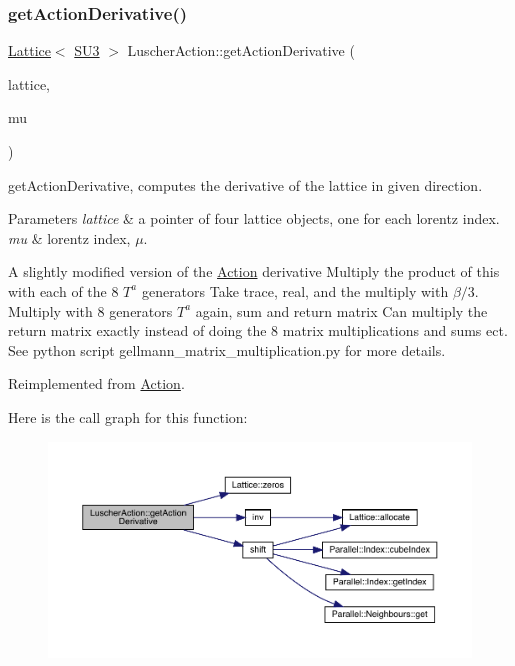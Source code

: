 \subsubsection{\texorpdfstring{getActionDerivative()}{getActionDerivative()}}
{\footnotesize\ttfamily \mbox{\hyperlink{class_lattice}{Lattice}}$<$ \mbox{\hyperlink{class_s_u3}{S\+U3}} $>$ Luscher\+Action\+::get\+Action\+Derivative (\begin{DoxyParamCaption}\item[{\mbox{\hyperlink{class_lattice}{Lattice}}$<$ \mbox{\hyperlink{class_s_u3}{S\+U3}} $>$ $\ast$}]{lattice,  }\item[{int}]{mu }\end{DoxyParamCaption})\hspace{0.3cm}{\ttfamily [virtual]}}



get\+Action\+Derivative, computes the derivative of the lattice in given direction. 


\begin{DoxyParams}{Parameters}
{\em lattice} & a pointer of four lattice objects, one for each lorentz index. \\
\hline
{\em mu} & lorentz index, $\mu$. \\
\hline
\end{DoxyParams}
A slightly modified version of the \mbox{\hyperlink{class_action}{Action}} derivative Multiply the product of this with each of the 8 $T^a$ generators Take trace, real, and the multiply with $\beta/3$. Multiply with 8 generators $T^a$ again, sum and return matrix Can multiply the return matrix exactly instead of doing the 8 matrix multiplications and sums ect. See python script gellmann\+\_\+matrix\+\_\+multiplication.\+py for more details.

Reimplemented from \mbox{\hyperlink{class_action_a78168dd7c3819a3365e28fc1aae1b9b6}{Action}}.

Here is the call graph for this function\+:
\nopagebreak
\begin{figure}[H]
\begin{center}
\leavevmode
\includegraphics[width=350pt]{class_luscher_action_ac11785b2df276816a098a87e6ac514c7_cgraph}
\end{center}
\end{figure}
\mbox{\label{class_luscher_action_a1955f8eea8b0771f6c737c39e3fc11b2}} 

